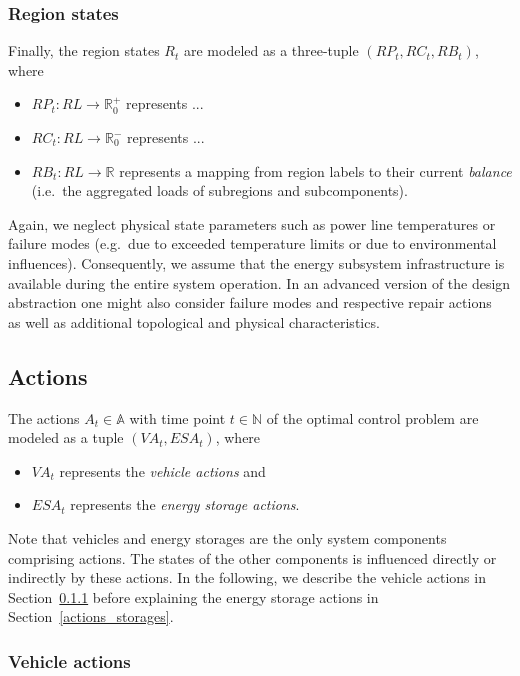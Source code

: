 \subsubsection{Region states}
\label{states_regions}

Finally, the region states $R_t$ are modeled as a three-tuple $(RP_t, RC_t, RB_t)$, where
\begin{itemize}
	\item $RP_t: RL \rightarrow \mathbb{R}_0^+$ represents ...
	\item $RC_t: RL \rightarrow \mathbb{R}_0^-$ represents ...
	\item $RB_t: RL \rightarrow \mathbb{R}$ represents a mapping from region labels to their current \textit{balance} (i.e.\ the aggregated loads of subregions and subcomponents).
\end{itemize}
Again, we neglect physical state parameters such as power line temperatures or failure modes (e.g.\ due to exceeded temperature limits or due to environmental influences). Consequently, we assume that the energy subsystem infrastructure is available during the entire system operation. In an advanced version of the design abstraction one might also consider failure modes and respective repair actions ~\cite{?} as well as additional topological and physical characteristics.

\subsection{Actions}
\label{actions}

The actions $A_t \in \mathbb{A}$ with time point $t \in \mathbb{N}$ of the optimal control problem are modeled as a tuple $(VA_t, ESA_t)$, where
\begin{itemize}
	\item $VA_t$ represents the \textit{vehicle actions} and
	\item $ESA_t$ represents the \textit{energy storage actions}.
\end{itemize}
Note that vehicles and energy storages are the only system components comprising actions. The states of the other components is influenced directly or indirectly by these actions. In the following, we describe the vehicle actions in Section~\ref{actions_vehicles} before explaining the energy storage actions in Section~\ref{actions_storages}.

\subsubsection{Vehicle actions}
\label{actions_vehicles}

